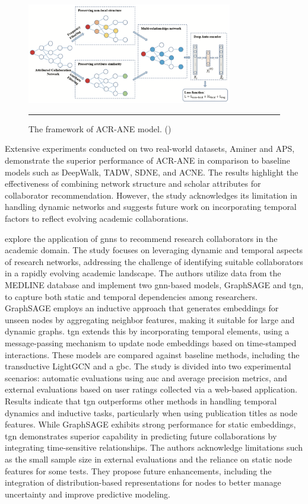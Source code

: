 \begin{figure}[htbp]
    \centering
 \includegraphics[width=0.8\textwidth]{figures/literature-review/academic-collaborator-recommendation-framework.png}
     \rule{35em}{0.5pt}
    \caption{The framework of ACR-ANE model. (\textcite{Du2022})}
 \label{fig:acr-ane}
\end{figure}

Extensive experiments conducted on two real-world datasets, Aminer and APS, demonstrate the superior performance of ACR-ANE in comparison to baseline models such as DeepWalk, TADW, SDNE, and ACNE.
The results highlight the effectiveness of combining network structure and scholar attributes for collaborator recommendation.
However, the study acknowledges its limitation in handling dynamic networks and suggests future work on incorporating temporal factors to reflect evolving academic collaborations.

\textcite{Zhu2022} explore the application of \glspl{gnn} to recommend research collaborators in the academic domain.
The study focuses on leveraging dynamic and temporal aspects of research networks, addressing the challenge of identifying suitable collaborators in a rapidly evolving academic landscape.
The authors utilize data from the MEDLINE database and implement two \gls{gnn}-based models, GraphSAGE and \gls{tgn}, to capture both static and temporal dependencies among researchers.
GraphSAGE employs an inductive approach that generates embeddings for unseen nodes by aggregating neighbor features, making it suitable for large and dynamic graphs.
\gls{tgn} extends this by incorporating temporal elements, using a message-passing mechanism to update node embeddings based on time-stamped interactions.
These models are compared against baseline methods, including the transductive LightGCN and a \gls{gbc}.
The study is divided into two experimental scenarios: automatic evaluations using \gls{auc} and average precision metrics, and external evaluations based on user ratings collected via a web-based application.
Results indicate that \gls{tgn} outperforms other methods in handling temporal dynamics and inductive tasks, particularly when using publication titles as node features.
While GraphSAGE exhibits strong performance for static embeddings, \gls{tgn} demonstrates superior capability in predicting future collaborations by integrating time-sensitive relationships.
The authors acknowledge limitations such as the small sample size in external evaluations and the reliance on static node features for some tests.
They propose future enhancements, including the integration of distribution-based representations for nodes to better manage uncertainty and improve predictive modeling.

